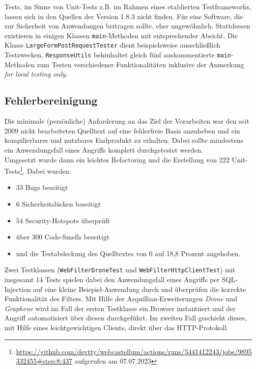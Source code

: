 Tests, im Sinne von Unit-Tests z.B. im Rahmen eines etablierten Testframeworks, lassen sich in den Quellen der Version 1.8.3 nicht finden. Für eine Software, die zur Sicherheit von Anwendungen beitragen sollte, eher ungewöhnlich. Stattdessen existieren in einigen Klassen \verb=main=-Methoden mit entsprechender Absicht. Die Klasse \verb=LargeFormPostRequestTester= dient beispielsweise ausschließlich Testzwecken. \verb=ResponseUtils= behinhaltet gleich fünf auskommentierte \verb=main=-Methoden zum Testen verschiedener Funktionalitäten inklusive der Anmerkung \emph{for local testing only}. 


\subsection{Fehlerbereinigung}
\label{sec:centralconf}
Die minimale (persönliche) Anforderung an das Ziel der Vorarbeiten war den seit 2009 nicht bearbeiteten Quelltext auf eine fehlerfreie Basis anzuheben und ein kompilierbares und nutzbares Endprodukt zu erhalten. Dabei sollte mindestens ein Anwendungsfall eines Angriffs komplett durchgetestet werden.\\

Umgesetzt wurde dann ein leichtes Refactoring und die Erstellung von 222 Unit-Tests\footnote{\url{https://github.com/devtty/webcastellum/actions/runs/5441412243/jobs/9895332455\#step:8:437} aufgerufen am 07.07.2023}. Dabei wurden:

\begin{itemize}
    \item 33 Bugs beseitigt
    \item 6 Sicherheitslücken beseitigt
    \item 54 Security-Hotspots überprüft
    \item über 300 Code-Smells beseitigt
    \item und die Testabdeckung des Quelltextes von 0 auf 18,8 Prozent angehoben.
\end{itemize}

Zwei Testklassen (\verb=WebFilterDroneTest= und \verb=WebFilterHttpClientTest=) mit insgesamt 14 Tests spielen dabei den Anwendungsfall eines Angriffs per SQL-Injection auf eine kleine Beispiel-Anwendung durch und überprüfen die korrekte Funktionalität des Filters. Mit Hilfe der Arquillian-Erweiterungen \emph{Drone} und \emph{Graphene} wird im Fall der ersten Testklasse ein Browser instantiiert und der Angriff automatisiert über diesen durchgeführt. Im zweiten Fall geschieht dieses, mit Hilfe eines leichtgewichtigen Clients, direkt über das HTTP-Protokoll.

